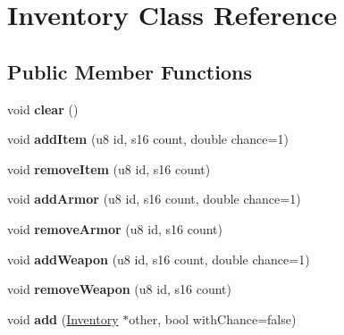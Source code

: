 \hypertarget{classInventory}{\section{Inventory Class Reference}
\label{classInventory}
}
\subsection*{Public Member Functions}
\begin{DoxyCompactItemize}
\item 
\hypertarget{classInventory_a181cdda67bcd1aef95aafe2b7a8432ea}{void {\bfseries clear} ()}\label{classInventory_a181cdda67bcd1aef95aafe2b7a8432ea}

\item 
\hypertarget{classInventory_a075ddcd27c4cb68ca9e2794fc8a176c5}{void {\bfseries add\-Item} (u8 id, s16 count, double chance=1)}\label{classInventory_a075ddcd27c4cb68ca9e2794fc8a176c5}

\item 
\hypertarget{classInventory_a147cb87a117188c995a2223bd14b4bab}{void {\bfseries remove\-Item} (u8 id, s16 count)}\label{classInventory_a147cb87a117188c995a2223bd14b4bab}

\item 
\hypertarget{classInventory_a5367d26bde8ba29070eb2f1fe1430092}{void {\bfseries add\-Armor} (u8 id, s16 count, double chance=1)}\label{classInventory_a5367d26bde8ba29070eb2f1fe1430092}

\item 
\hypertarget{classInventory_aaa5a3f4238d333772d92389d3cc21c57}{void {\bfseries remove\-Armor} (u8 id, s16 count)}\label{classInventory_aaa5a3f4238d333772d92389d3cc21c57}

\item 
\hypertarget{classInventory_ae6d51b42fc94b0674408e2ac4928fde4}{void {\bfseries add\-Weapon} (u8 id, s16 count, double chance=1)}\label{classInventory_ae6d51b42fc94b0674408e2ac4928fde4}

\item 
\hypertarget{classInventory_a70d0469636cbdc17e93179895e22aa97}{void {\bfseries remove\-Weapon} (u8 id, s16 count)}\label{classInventory_a70d0469636cbdc17e93179895e22aa97}

\item 
\hypertarget{classInventory_a093d0530ae59f20c62b13aaf9c1d2e8a}{void {\bfseries add} (\hyperlink{classInventory}{Inventory} $\ast$other, bool with\-Chance=false)}\label{classInventory_a093d0530ae59f20c62b13aaf9c1d2e8a}


\end{DoxyCompactItemize}
